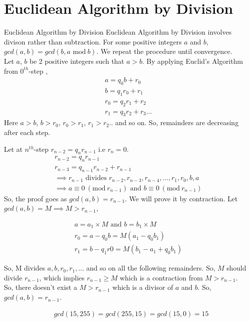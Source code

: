 \documentclass[8pt]{beamer}
\begin{document}
\section{Euclidean Algorithm by Division}
\begin{frame}[allowframebreaks]{Euclidean Algorithm by Division}
Euclidean Algorithm by Division involves divison rather than subtraction. For some positive integers $a$ and $b$, $gcd(a, b) = gcd(b, a \textrm{ mod}\ b)$. We repeat the procedure until convergence.\\

 Let $a$, $b$ be 2 positive integers such that $a > b$. By applying Euclid's Algorithm from $0^{th}$-step ,
 \begin{align}
     a = q_{0}b + r_{0}\label{eq:ED1}\\
     b = q_{1}r_{0} + r_{1}\\
     r_{0} = q_{2}r_{1} + r_{2}\\
     r_{1} = q_{3}r_{2} + r_{3}...
 \end{align}
 Here $a > b$, $ b > r_{0}$, $r_{0} > r_{1}$, $r_{1} > r_{2}$.. and so on. So, remainders are decreasing after each step.
 
 \framebreak
 
 Let at $n^{th}$-step $r_{n-2} = q_{n}r_{n-1}$ i.e $r_{n} = 0$.
 \begin{align}
    r_{n-2} = q_{n}r_{n-1}\label{eq:ED2}\\
    r_{n-3} = q_{n-1}r_{n-2} + r_{n-1}\\
    \implies r_{n-1} \text{ divides } r_{n-2}, r_{n-3}, r_{n-4},..., r_{1}, r_{0}, b, a\\
    \implies a \equiv 0\ (\textrm{mod}\ r_{n-1}) \text{ and } b \equiv 0\ (\textrm{mod}\ r_{n-1})
\end{align}
So, the proof goes as $gcd(a,b) = r_{n-1}$. We will prove it by contraction. Let  $gcd(a,b) = M \implies M > r_{n-1}$,

\begin{align}
    a = a_{1} \times M \text{ and } b = b_{1} \times M\\
    r_{0} = a - q_{0}b = M(a_{1} - q_{0}b_{1})\\
    r_{1} = b - q_{1}r{0} = M(b_{1} - a_{1} + q_{0}b_{1})
\end{align}

\framebreak

So, M divides $a, b, r_{0}, r_{1}, ... $ and so on all the following remainders. So, $M$ should divide $r_{n-1}$, which implies $r_{n-1} \geq M$ which is a contraction from $M > r_{n-1}$.\\
\vspace{0.2in}
So, there doesn't exist a $M > r_{n-1}$ which is a divisor of $a$ and $b$. So, $gcd(a,b)  = r_{n-1}$.

\[
\begin{split}
&gcd(15,255) = gcd(255,15) = gcd(15,0) = 15
\end{split}\]

\end{frame}
\end{document}

